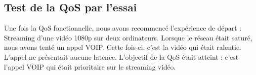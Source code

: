     \subsection{Test de la QoS par l'essai}
    
	Une fois la QoS fonctionnelle, nous avons recommencé l'expérience de départ : Streaming d'une vidéo 1080p sur deux ordinateurs. Lorsque le réseau était saturé, nous avons tenté un appel VOIP. Cette fois-ci, c'est la vidéo qui était ralentie. L'appel ne présentait aucune latence. 
    L'objectif de la QoS était atteint : c'est l'appel VOIP qui était prioritaire sur le streaming vidéo.
  	
    
    
    
    
    
    
    